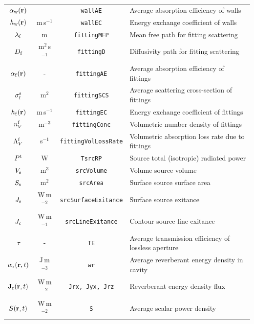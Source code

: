 \documentclass[a4paper]{article}
\numberwithin{equation}{section}
\begin{document}
\begin{center}
\begin{supertabular}{|c|c|c|l|}
$\alpha_{\mathrm{w}}(\boldsymbol{\mathrm{r}})$     &~               &\texttt{wallAE}             &Average absorption efficiency of walls \\
$h_{\mathrm{w}}(\boldsymbol{\mathrm{r}})$          &m\,s$^{-1}$     &\texttt{wallEC}             &Energy exchange coefficient of walls \\
$\lambda _{\mathrm{f}}$      &m               &\texttt{fittingMFP}         &Mean free path for fitting scattering \\
$D_{\mathrm{f}}$             &m$^2$\,s$^{-1}$ &\texttt{fittingD}           &Diffusivity path for fitting scattering \\
$\alpha_{\mathrm{f}}(\boldsymbol{\mathrm{r}})$     &-               &\texttt{fittingAE}          &Average absorption efficiency of fittings \\
$\sigma_{\mathrm{f}}^{\mathrm{s}}$    &m$^2$           &\texttt{fittingSCS}         &Average scattering cross-section of fittings \\
$h_{\mathrm{f}}(\boldsymbol{\mathrm{r}})$          &m\,s$^{-1}$     &\texttt{fittingEC}          &Energy exchange coefficient of fittings \\
$n_V^{\mathrm{f}}$           &m$^{-3}$        &\texttt{fittingConc}        &Volumetric number density of fittings \\
$\Lambda_V^{\mathrm{f}}$     &s$^{-1}$        &\texttt{fittingVolLossRate} &Volumetric absorption loss rate due to fittings \\
$P^{\mathrm{t}}$             &W               &\texttt{TsrcRP}             &Source total (isotropic) radiated power \\
$V_{\mathrm{s}}$             &m$^3$           &\texttt{srcVolume}          &Volume source volume \\
$S_{\mathrm{s}}$             &m$^2$           &\texttt{srcArea}            &Surface source surface area \\
$J_{\mathrm{s}}$             &W\,m$^{-2}$     &\texttt{srcSurfaceExitance} &Surface source exitance \\
$J_{\mathrm{c}}$             &W\,m$^{-1}$     &\texttt{srcLineExitance}    &Contour source line exitance \\
$\tau$              &-               &\texttt{TE}                 &Average transmission efficiency of lossless aperture \\
$w_{\mathrm{r}}(\boldsymbol{\mathrm{r}},t)$         &J\,m$^{-3}$     &\texttt{wr}                 &Average reverberant energy density in cavity \\
$\boldsymbol{\mathrm{J}}_{\mathrm{r}}(\boldsymbol{\mathrm{r}},t)$       &W\,m$^{-2}$     &\texttt{Jrx, Jyx, Jrz}      &Reverberant energy density flux \\
$S(\boldsymbol{\mathrm{r}},t)$             &W\,m$^{-2}$     &\texttt{S}                  &Average scalar power density \\
\hline
\end{supertabular}
\end{center}
\end{document}

